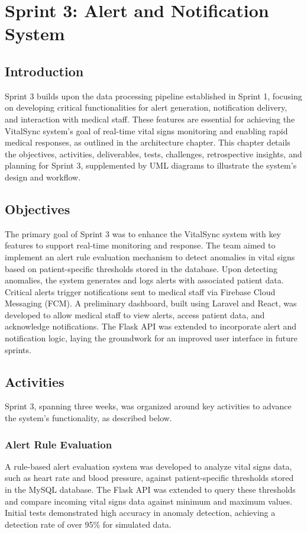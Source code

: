 \chapter{Sprint 3: Alert and Notification System}
\label{chap:sprint3}

\section{Introduction}
Sprint 3 builds upon the data processing pipeline established in Sprint 1, focusing on developing critical functionalities for alert generation, notification delivery, and interaction with medical staff. These features are essential for achieving the VitalSync system's goal of real-time vital signs monitoring and enabling rapid medical responses, as outlined in the architecture chapter. This chapter details the objectives, activities, deliverables, tests, challenges, retrospective insights, and planning for Sprint 3, supplemented by UML diagrams to illustrate the system's design and workflow.

\section{Objectives}
The primary goal of Sprint 3 was to enhance the VitalSync system with key features to support real-time monitoring and response. The team aimed to implement an alert rule evaluation mechanism to detect anomalies in vital signs based on patient-specific thresholds stored in the database. Upon detecting anomalies, the system generates and logs alerts with associated patient data. Critical alerts trigger notifications sent to medical staff via Firebase Cloud Messaging (FCM). A preliminary dashboard, built using Laravel and React, was developed to allow medical staff to view alerts, access patient data, and acknowledge notifications. The Flask API was extended to incorporate alert and notification logic, laying the groundwork for an improved user interface in future sprints.

\section{Activities}
Sprint 3, spanning three weeks, was organized around key activities to advance the system's functionality, as described below.

\subsection{Alert Rule Evaluation}
A rule-based alert evaluation system was developed to analyze vital signs data, such as heart rate and blood pressure, against patient-specific thresholds stored in the MySQL database. The Flask API was extended to query these thresholds and compare incoming vital signs data against minimum and maximum values. Initial tests demonstrated high accuracy in anomaly detection, achieving a detection rate of over 95\% for simulated data.

